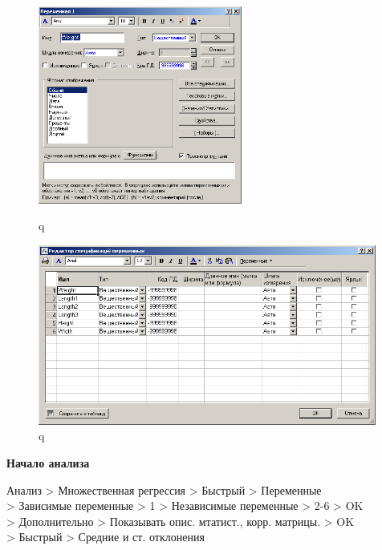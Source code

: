 \begin{figure}[!h]
  \centering
  \begin{minipage}{0.49\textwidth}
    \centering

    \includegraphics[height=6.5cm]
    {inc/var5__2.PNG}

    \caption{q}
    \label{fig:var5__2}
  \end{minipage}
  \begin{minipage}{0.49\textwidth}
    \centering

    \includegraphics[width=0.99\textwidth]
    {inc/var5__3.PNG}

    \caption{q}
    \label{fig:var5__3}
  \end{minipage}
\end{figure}

\newpage

\begin{center}
  \textbf{Начало анализа}
\end{center}

Анализ > Множественная регрессия > Быстрый > Переменные\\
> Зависимые переменные > 1 > Независимые переменные > 2-6 > OK\\
> Дополнительно > Показывать опис. мтатист., корр. матрицы. > OK\\
> Быстрый > Средние и ст. отклонения

